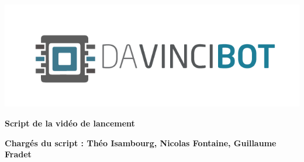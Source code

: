 \documentclass[12pt]{report}
\begin{document}
\begin{minipage}{0.3\linewidth}
\includegraphics[scale = 0.2]{img/logo_assos.png}
\end{minipage}
\vspace{1cm}



\begin{center}
\textbf{Script de la vidéo de lancement}
\end{center}

\textbf{Chargés du script : Théo Isambourg, Nicolas Fontaine, Guillaume Fradet}

\vspace{1cm}
\end{document}
